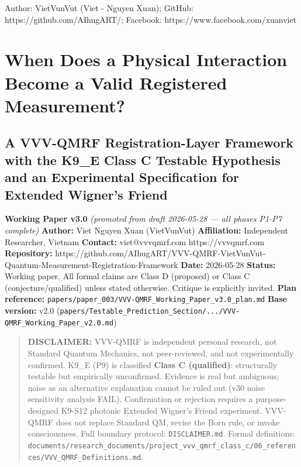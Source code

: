 \documentclass[
  11pt,
]{article}
\author{}
\date{}
\begin{document}
Author: VietVunVut (Viet - Nguyen Xuan); GitHub:
https://github.com/AIhugART/; Facebook:
https://www.facebook.com/xuanviet

\section{When Does a Physical Interaction Become a Valid Registered
Measurement?}\label{when-does-a-physical-interaction-become-a-valid-registered-measurement}

\subsection{A VVV-QMRF Registration-Layer Framework with the K9\_E Class
C Testable Hypothesis and an Experimental Specification for Extended
Wigner's
Friend}\label{a-vvv-qmrf-registration-layer-framework-with-the-k9_e-class-c-testable-hypothesis-and-an-experimental-specification-for-extended-wigners-friend}

\textbf{Working Paper v3.0} \emph{(promoted from draft 2026-05-28 ---
all phases P1-P7 complete)} \textbf{Author:} Viet Nguyen Xuan
(VietVunVut) \textbf{Affiliation:} Independent Researcher, Vietnam
\textbf{Contact:} viet@vvvqmrf.com \textbar{} https://vvvqmrf.com
\textbf{Repository:}
https://github.com/AIhugART/VVV-QMRF-VietVunVut-Quantum-Measurement-Registration-Framework
\textbf{Date:} 2026-05-28 \textbf{Status:} Working paper. All formal
claims are Class D (proposed) or Class C (conjecture/qualified) unless
stated otherwise. Critique is explicitly invited. \textbf{Plan
reference:}
\texttt{papers/paper\_003/VVV-QMRF\_Working\_Paper\_v3.0\_plan.md}
\textbf{Base version:} v2.0
(\texttt{papers/Testable\_Prediction\_Section/.../VVV-QMRF\_Working\_Paper\_v2.0.md})

\begin{quote}
\textbf{DISCLAIMER:} VVV-QMRF is independent personal research, not
Standard Quantum Mechanics, not peer-reviewed, and not experimentally
confirmed. K9\_E (P9) is classified \textbf{Class C (qualified)}:
structurally testable but empirically unconfirmed. Evidence is real but
ambiguous; noise as an alternative explanation cannot be ruled out (v30
noise sensitivity analysis FAIL). Confirmation or rejection requires a
purpose-designed K9-S12 photonic Extended Wigner's Friend experiment.
VVV-QMRF does not replace Standard QM, revise the Born rule, or invoke
consciousness. Full boundary protocol: \texttt{DISCLAIMER.md}. Formal
definitions:
\texttt{documents/research\_documents/project\_vvv\_qmrf\_class\_c/06\_references/VVV\_QMRF\_Definitions.md}.
\end{quote}
\end{document}
